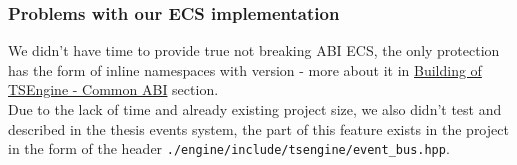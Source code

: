\newpage
\subsubsection{Problems with our ECS implementation}
We didn't have time to provide true not breaking ABI ECS, the only protection has the form of inline namespaces with version - more about it in \hyperref[sec:abi]{Building of TSEngine - Common ABI} section.\\
Due to the lack of time and already existing project size, we also didn't test and described in the thesis events system, the part of this feature exists in the project in the form of the header \texttt{./engine/include/tsengine/event\_bus.hpp}.
